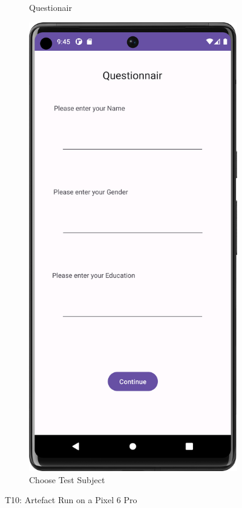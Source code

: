 \begin{figure}[htbp]
\begin{subfigure}[b]{0.25\textwidth}
        \caption{ Questionair} %
        \label{subfig:QuestionairPixel}
    \end{subfigure}
        \hspace{1cm}
    \begin{subfigure}[b]{0.25\textwidth}
        \centering
        \includegraphics[width=\textwidth]{content/07_evaluation_of_the_solution/Screenshot_T10c.png}
        \caption{Choose Test Subject}
        \label{subfig:chooseTestSubjectPixel}
    \end{subfigure}
       \caption{T10: Artefact Run on a Pixel 6 Pro}
       \label{fig:uiScreensPixel6}
\end{figure}

